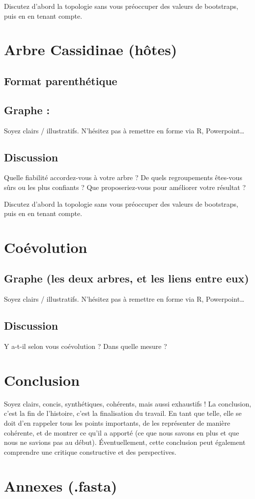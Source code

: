 \documentclass[a4paper, 11pt]{article}
\begin{document}
Discutez d’abord la topologie sans vous préoccuper des valeurs de bootstraps, puis en en tenant compte.

\section{Arbre Cassidinae (hôtes)}
\subsection{Format parenthétique} 


\subsection{Graphe :}
Soyez clairs / illustratifs. N’hésitez pas à remettre en forme via R, Powerpoint…

\subsection{Discussion}
Quelle fiabilité accordez-vous à votre arbre ? De quels regroupements êtes-vous sûrs ou les plus confiants ? Que proposeriez-vous pour améliorer votre résultat ?

Discutez d’abord la topologie sans vous préoccuper des valeurs de bootstraps, puis en en tenant compte.
\section{Coévolution}

\subsection{Graphe (les deux arbres, et les liens entre eux)}
Soyez clairs / illustratifs. N’hésitez pas à remettre en forme via R, Powerpoint…

\subsection{Discussion}
Y a-t-il selon vous coévolution ? Dans quelle mesure ?
\section{Conclusion}
Soyez clairs, concis, synthétiques, cohérents, mais aussi exhaustifs ! La conclusion, c’est la fin de l’histoire, c’est la finalisation du travail. En tant que telle, elle se doit d’en rappeler tous les points importants, de les représenter de manière cohérente, et de montrer ce qu’il a apporté (ce que nous savons en plus et que nous ne savions pas au début). Éventuellement, cette conclusion peut également comprendre une critique constructive et des perspectives.

\printbibliography

\section{Annexes (.fasta)}
\end{document}
